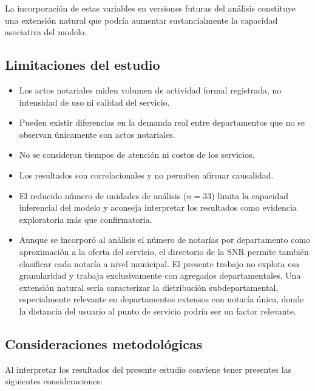 \documentclass{article}
\begin{document}
\noindent La incorporación de estas variables en versiones futuras del
análisis constituye una extensión natural que podría aumentar
sustancialmente la capacidad asociativa del modelo.

\subsection{Limitaciones del estudio}

\begin{itemize}
    \item Los actos notariales miden volumen de actividad
    formal registrada, no intensidad de uso ni calidad del servicio.
    \item Pueden existir diferencias en la demanda real entre departamentos
    que no se observan únicamente con actos notariales.
    \item No se consideran tiempos de atención ni costos de los servicios.
    \item Los resultados son correlacionales y no permiten afirmar causalidad.
    \item El reducido número de unidades de análisis ($n = 33$)
    limita la capacidad inferencial del modelo y aconseja interpretar
    los resultados como evidencia exploratoria más que confirmatoria.
    \item Aunque se incorporó al análisis el número de notarías por
    departamento como aproximación a la oferta del servicio, el
    directorio de la SNR permite también clasificar cada notaría a
    nivel municipal. El presente trabajo no explota esa granularidad y
    trabaja exclusivamente con agregados departamentales. Una extensión
    natural sería caracterizar la distribución subdepartamental,
    especialmente relevante en departamentos extensos con notaría
    única, donde la distancia del usuario al punto de servicio podría
    ser un factor relevante.
\end{itemize}

\subsection{Consideraciones metodológicas}
\label{subsec:consideraciones}

Al interpretar los resultados del presente estudio conviene tener
presentes las siguientes consideraciones:
\end{document}
